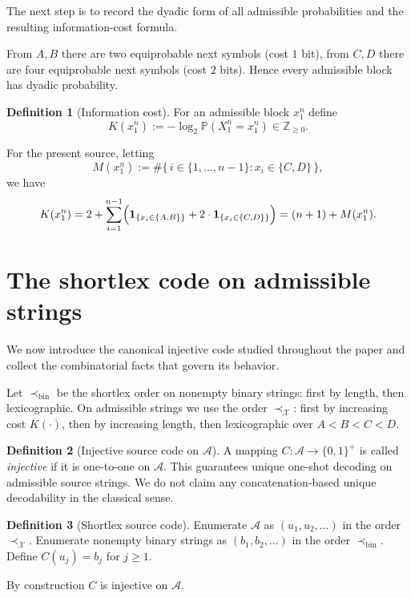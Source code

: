 \documentclass[10pt,a4paper]{article}
\theoremstyle{definition}
\newtheorem{definition}{Definition}
\theoremstyle{remark}
\newcommand{\1}{\mathbf{1}}
\newcommand{\PP}{\mathbb{P}}
\begin{document}
The next step is to record the dyadic form of all admissible probabilities and the resulting information-cost formula.

From $A,B$ there are two equiprobable next symbols (cost $1$ bit), from $C,D$ there are four equiprobable next symbols (cost $2$ bits). Hence every admissible block has dyadic probability.

\begin{definition}[Information cost]
For an admissible block $x_1^n$ define
\[
K(x_1^n):=-\log_2 \PP(X_1^n=x_1^n)\in\mathbb Z_{\ge 0}.
\]
\end{definition}

For the present source, letting
\[
M(x_1^n):=\#\{\, i\in\{1,\dots,n-1\}: x_i\in\{C,D\}\,\},
\]
we have
\begin{equation}\label{eq:K-formula}
K(x_1^n)=2+\sum_{i=1}^{n-1}\Bigl(\1_{\{x_i\in\{A,B\}\}}+2 \cdot \1_{\{x_i\in\{C,D\}\}}\Bigr)
=(n+1)+M(x_1^n).
\end{equation}

\section{The shortlex code on admissible strings}
We now introduce the canonical injective code studied throughout the paper and collect the combinatorial facts that govern its behavior.

Let $\prec_{\mathrm{bin}}$ be the shortlex order on nonempty binary strings: first by length, then lexicographic. On admissible strings we use the order $\prec_{\mathcal X}$: first by increasing cost $K(\cdot)$, then by increasing length, then lexicographic over $A<B<C<D$.

\begin{definition}[Injective source code on $\mathcal A$]
A mapping $C:\mathcal A\to\{0,1\}^+$ is called \emph{injective} if it is one-to-one on $\mathcal A$.
This guarantees unique one-shot decoding on admissible source strings. We do not claim any concatenation-based
unique decodability in the classical sense.
\end{definition}

\begin{definition}[Shortlex source code]
Enumerate $\mathcal A$ as $(u_1,u_2,\dots)$ in the order $\prec_{\mathcal X}$.
Enumerate nonempty binary strings as $(b_1,b_2,\dots)$ in the order $\prec_{\mathrm{bin}}$.
Define $C(u_j)=b_j$ for $j\ge1$.
\end{definition}

By construction $C$ is injective on $\mathcal A$.
\end{document}

